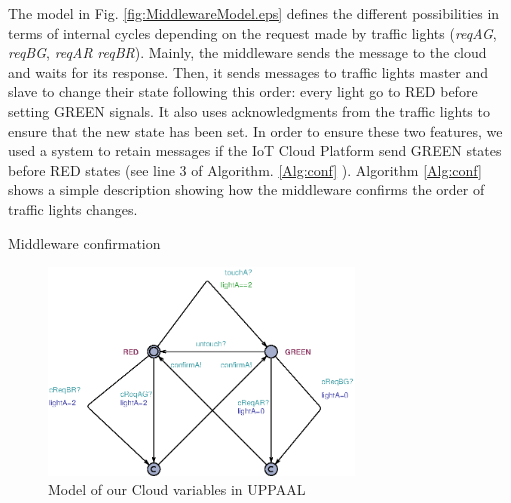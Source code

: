 \documentclass[conference]{../../setup/IEEEtran}
\begin{document}
The model in Fig. \ref{fig:MiddlewareModel.eps} defines the different possibilities in terms of internal cycles depending on the request made by traffic lights (\emph{reqAG}, \emph{reqBG}, \emph{reqAR} \emph{reqBR}). Mainly, the middleware sends the message to the cloud and waits for its response. Then, it sends messages to traffic lights master and slave to change their state following this order: every light go to RED before setting GREEN signals. It also uses acknowledgments from the traffic lights to ensure that the new state has been set. In order to ensure these two features, we used a system to retain messages if the IoT Cloud Platform send GREEN states before RED states (see line 3 of Algorithm. \ref{Alg:conf} ). Algorithm \ref{Alg:conf} shows a simple description showing how the middleware confirms the order of traffic lights changes.



\LinesNumbered \begin{algorithm}[ht] \caption{Middleware confirmation\label{Alg:conf}}
\end{algorithm}
\begin{figure}[!htb]
\centering
\includegraphics[width=3.2in]{Figures/CloudModel.eps}
\caption{Model of our Cloud variables in UPPAAL}
\label{fig:CloudModel.eps}
\end{figure}
\end{document}
